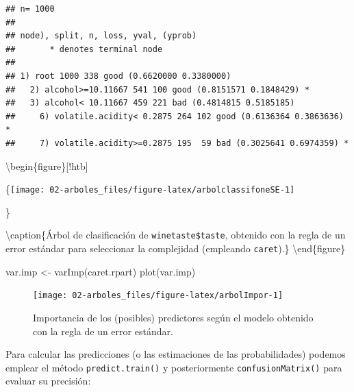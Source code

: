 \documentclass[
  spanish,
]{book}
\newenvironment{Shaded}{\begin{snugshade}}{\end{snugshade}}
\newcommand{\CommentTok}[1]{\textcolor[rgb]{0.56,0.35,0.01}{\textit{#1}}}
\newcommand{\FunctionTok}[1]{\textcolor[rgb]{0.00,0.00,0.00}{#1}}
\newcommand{\NormalTok}[1]{#1}
\newcommand{\OtherTok}[1]{\textcolor[rgb]{0.56,0.35,0.01}{#1}}
\newcommand{\SpecialCharTok}[1]{\textcolor[rgb]{0.00,0.00,0.00}{#1}}
\theoremstyle{break}
\theoremstyle{definition}
\theoremstyle{definition}
\theoremstyle{definition}
\theoremstyle{definition}
\theoremstyle{remark}
\begin{document}
\begin{verbatim}
## n= 1000 
## 
## node), split, n, loss, yval, (yprob)
##       * denotes terminal node
## 
## 1) root 1000 338 good (0.6620000 0.3380000)  
##   2) alcohol>=10.11667 541 100 good (0.8151571 0.1848429) *
##   3) alcohol< 10.11667 459 221 bad (0.4814815 0.5185185)  
##     6) volatile.acidity< 0.2875 264 102 good (0.6136364 0.3863636) *
##     7) volatile.acidity>=0.2875 195  59 bad (0.3025641 0.6974359) *
\end{verbatim}

\begin{Shaded}
\end{Shaded}

\textbackslash begin\{figure\}{[}!htb{]}

\{\centering \texttt{[image: 02-arboles\_files/figure-latex/arbolclassifoneSE-1]}

\}

\textbackslash caption\{Árbol de clasificación de \texttt{winetaste\$taste}, obtenido con la regla de un error estándar para seleccionar la complejidad (empleando \texttt{caret}).\}\label{fig:arbolclassifoneSE}
\textbackslash end\{figure\}

\begin{Shaded}
\begin{Highlighting}[]
\NormalTok{var.imp }\OtherTok{\textless{}{-}} \FunctionTok{varImp}\NormalTok{(caret.rpart)}
\FunctionTok{plot}\NormalTok{(var.imp)}
\end{Highlighting}
\end{Shaded}

\begin{figure}[!htb]

{\centering \texttt{[image: 02-arboles\_files/figure-latex/arbolImpor-1]} 

}

\caption{Importancia de los (posibles) predictores según el modelo obtenido con la regla de un error estándar.}\label{fig:arbolImpor}
\end{figure}

Para calcular las predicciones (o las estimaciones de las probabilidades) podemos emplear el método \texttt{predict.train()} y posteriormente \texttt{confusionMatrix()} para evaluar su precisión:
\end{document}
